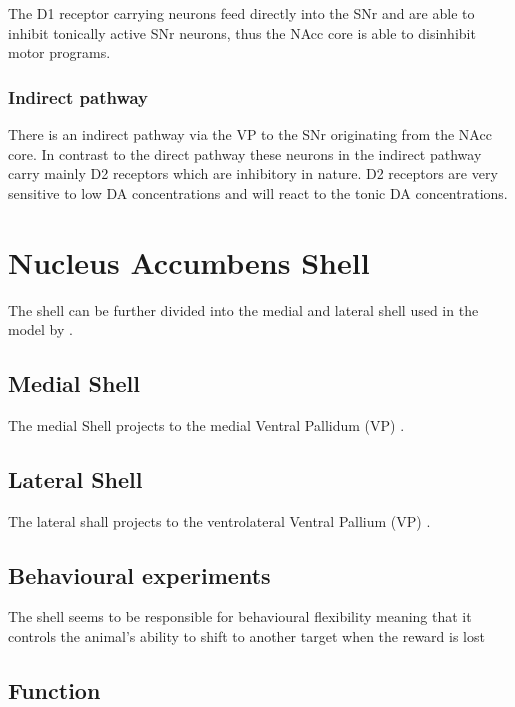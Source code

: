 \documentclass[12pt,a4paper]{article}
\let\oldsection\section
\renewcommand\section{\clearpage\oldsection}
\begin{document}
The D1 receptor carrying neurons feed directly into the SNr and are able to inhibit tonically active SNr neurons, thus the NAcc core is able to disinhibit motor programs. 

\subsubsection{Indirect pathway}

There is an indirect pathway via the VP to the SNr originating from the NAcc core. In contrast to the direct pathway these neurons in the indirect pathway carry mainly D2 receptors which are inhibitory in nature. D2 receptors are very sensitive to low DA concentrations and will react to the tonic DA concentrations. 




\section{Nucleus Accumbens Shell}

The shell can be further divided into the medial and lateral shell \citep{Ikemoto2007} \citep{Usuda1998} used in the model by \citep{Humphries2010}.

\subsection{Medial Shell}

The medial Shell projects to the medial Ventral Pallidum (VP) \citep{Ikemoto2007}.

\subsection{Lateral Shell}

The lateral shall projects to the ventrolateral Ventral Pallium (VP) \citep{Ikemoto2007}.


\subsection{Behavioural experiments}

The shell seems to be responsible for behavioural flexibility meaning that it controls the animal's ability to shift to another target when the reward is lost \citep{Aquili2014}

\subsection{Function}
\end{document}
